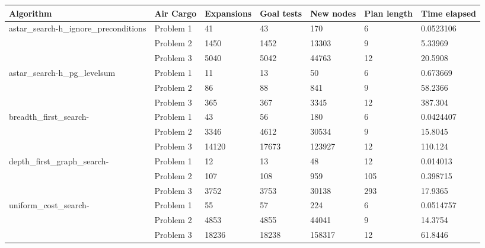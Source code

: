\documentclass{article}
\begin{document}
\begin{center}
\label{tab:overview}
\begin{footnotesize}
\begin{tabular}{lllllll}
\toprule
Algorithm & Air Cargo  & Expansions & Goal tests & New nodes & Plan length & Time elapsed \\
\midrule
astar\_search-h\_ignore\_preconditions & Problem 1 &         41 &         43 &       170 &           6 &    0.0523106 \\
                 & Problem 2 &       1450 &       1452 &     13303 &           9 &      5.33969 \\
                 & Problem 3 &       5040 &       5042 &     44763 &          12 &      20.5908 \\
astar\_search-h\_pg\_levelsum & Problem 1 &         11 &         13 &        50 &           6 &     0.673669 \\
                 & Problem 2 &         86 &         88 &       841 &           9 &      58.2366 \\
                 & Problem 3 &        365 &        367 &      3345 &          12 &      387.304 \\
breadth\_first\_search- & Problem 1 &         43 &         56 &       180 &           6 &    0.0424407 \\
                 & Problem 2 &       3346 &       4612 &     30534 &           9 &      15.8045 \\
                 & Problem 3 &      14120 &      17673 &    123927 &          12 &      110.124 \\
depth\_first\_graph\_search- & Problem 1 &         12 &         13 &        48 &          12 &     0.014013 \\
                 & Problem 2 &        107 &        108 &       959 &         105 &     0.398715 \\
                 & Problem 3 &       3752 &       3753 &     30138 &         293 &      17.9365 \\
uniform\_cost\_search- & Problem 1 &         55 &         57 &       224 &           6 &    0.0514757 \\
                 & Problem 2 &       4853 &       4855 &     44041 &           9 &      14.3754 \\
                 & Problem 3 &      18236 &      18238 &    158317 &          12 &      61.8446 \\
\bottomrule
\end{tabular}
\end{footnotesize}
\end{center}
\end{document}
